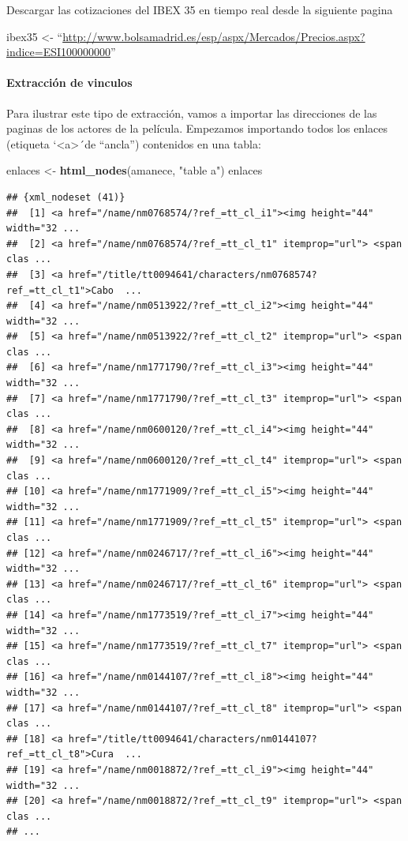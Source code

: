 \documentclass[]{article}
\newenvironment{Shaded}{\begin{snugshade}}{\end{snugshade}}
\newcommand{\KeywordTok}[1]{\textcolor[rgb]{0.13,0.29,0.53}{\textbf{#1}}}
\newcommand{\StringTok}[1]{\textcolor[rgb]{0.31,0.60,0.02}{#1}}
\newcommand{\NormalTok}[1]{#1}
\let\oldparagraph\paragraph
\renewcommand{\paragraph}[1]{\oldparagraph{#1}\mbox{}}
\newenvironment{ej}{\begin{Shaded}}{\end{Shaded}}
\begin{document}
\begin{ej}
Descargar las cotizaciones del IBEX 35 en tiempo real desde la siguiente
pagina

ibex35 \textless{}-
``\url{http://www.bolsamadrid.es/esp/aspx/Mercados/Precios.aspx?indice=ESI100000000}''
\end{ej}

\paragraph{Extracción de vinculos}\label{extraccion-de-vinculos}

Para ilustrar este tipo de extracción, vamos a importar las direcciones
de las paginas de los actores de la película. Empezamos importando todos
los enlaces (etiqueta `\textless{}a\textgreater{}´de ``ancla'')
contenidos en una tabla:

\begin{Shaded}
\begin{Highlighting}[]
\NormalTok{enlaces <-}\StringTok{ }\KeywordTok{html_nodes}\NormalTok{(amanece, }\StringTok{"table a"}\NormalTok{)}
\NormalTok{enlaces}
\end{Highlighting}
\end{Shaded}

\begin{verbatim}
## {xml_nodeset (41)}
##  [1] <a href="/name/nm0768574/?ref_=tt_cl_i1"><img height="44" width="32 ...
##  [2] <a href="/name/nm0768574/?ref_=tt_cl_t1" itemprop="url"> <span clas ...
##  [3] <a href="/title/tt0094641/characters/nm0768574?ref_=tt_cl_t1">Cabo  ...
##  [4] <a href="/name/nm0513922/?ref_=tt_cl_i2"><img height="44" width="32 ...
##  [5] <a href="/name/nm0513922/?ref_=tt_cl_t2" itemprop="url"> <span clas ...
##  [6] <a href="/name/nm1771790/?ref_=tt_cl_i3"><img height="44" width="32 ...
##  [7] <a href="/name/nm1771790/?ref_=tt_cl_t3" itemprop="url"> <span clas ...
##  [8] <a href="/name/nm0600120/?ref_=tt_cl_i4"><img height="44" width="32 ...
##  [9] <a href="/name/nm0600120/?ref_=tt_cl_t4" itemprop="url"> <span clas ...
## [10] <a href="/name/nm1771909/?ref_=tt_cl_i5"><img height="44" width="32 ...
## [11] <a href="/name/nm1771909/?ref_=tt_cl_t5" itemprop="url"> <span clas ...
## [12] <a href="/name/nm0246717/?ref_=tt_cl_i6"><img height="44" width="32 ...
## [13] <a href="/name/nm0246717/?ref_=tt_cl_t6" itemprop="url"> <span clas ...
## [14] <a href="/name/nm1773519/?ref_=tt_cl_i7"><img height="44" width="32 ...
## [15] <a href="/name/nm1773519/?ref_=tt_cl_t7" itemprop="url"> <span clas ...
## [16] <a href="/name/nm0144107/?ref_=tt_cl_i8"><img height="44" width="32 ...
## [17] <a href="/name/nm0144107/?ref_=tt_cl_t8" itemprop="url"> <span clas ...
## [18] <a href="/title/tt0094641/characters/nm0144107?ref_=tt_cl_t8">Cura  ...
## [19] <a href="/name/nm0018872/?ref_=tt_cl_i9"><img height="44" width="32 ...
## [20] <a href="/name/nm0018872/?ref_=tt_cl_t9" itemprop="url"> <span clas ...
## ...
\end{verbatim}
\end{document}
